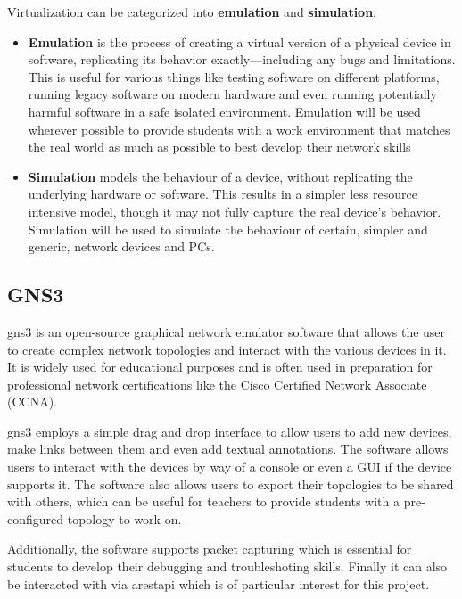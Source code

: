     Virtualization can be categorized into \textbf{emulation} and \textbf{simulation}. 

    \begin{itemize}
      \item \textbf{Emulation} is the process of creating a virtual version of a physical device in software, replicating its 
      behavior exactly—including any bugs and limitations. This is useful for various things like testing software on 
      different platforms, running legacy software on modern hardware and even running potentially harmful software in a safe 
      isolated environment.
      Emulation will be used wherever possible to provide students with a work environment that  matches the real world as much as 
      possible to best develop their network skills
      \item \textbf{Simulation} models the behaviour of a device, without replicating the underlying hardware or software.
      This results in a simpler less resource intensive model, though it may not fully capture the real device's behavior.
      Simulation will be used to simulate the behaviour of certain, simpler and generic, network devices and PCs.

    \end{itemize}


  \subsection{GNS3}
    \ac{gns3} is an open-source graphical network emulator software that allows the user to create complex network topologies 
    and interact with the various devices in it. It is widely used for educational purposes and is often used in preparation 
    for professional network certifications like the Cisco Certified Network Associate (CCNA).

    \ac{gns3} employs a simple drag and drop interface to allow users to add new devices, make links between them 
    and even add textual annotations. The software allows users to interact with the devices by way of a console or even a GUI
    if the device supports it. The software also allows users to export their topologies to be shared with others, which can
    be useful for teachers to provide students with a pre-configured topology to work on.

    Additionally, the software supports packet capturing which is essential for students to develop their debugging and 
    troubleshoting skills. Finally it can also be interacted with via a\ac{rest}\ac{api} which is of particular interest
    for this project.

